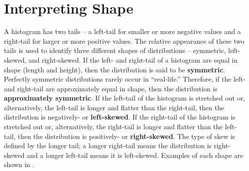 \documentclass[10pt,openany]{book}\usepackage[]{graphicx}\usepackage[]{color}
\begin{document}
\section{Interpreting Shape}
\vspace{-12pt}
A histogram has two tails -- a left-tail for smaller or more negative values and a right-tail for larger or more positive values.  The relative appearance of these two tails is used to identify three different shapes of distributions -- symmetric, left-skewed, and right-skewed.  If the left- and right-tail of a histogram are equal in shape (length and height), then the distribution is said to be \textbf{symmetric}.  Perfectly symmetric distributions rarely occur in ``real-life.''  Therefore, if the left- and right-tail are approximately equal in shape, then the distribution is \textbf{approximately symmetric}.  If the left-tail of the histogram is stretched out or, alternatively, the left-tail is longer and flatter than the right-tail, then the distribution is negatively- or \textbf{left-skewed}.  If the right-tail of the histogram is stretched out or, alternatively, the right-tail is longer and flatter than the left-tail, then the distribution is positively- or \textbf{right-skewed}.  The type of skew is defined by the longer tail; a longer right-tail means the distribution is right-skewed and a longer left-tail means it is left-skewed.  Examples of each shape are shown in .
\end{document}
